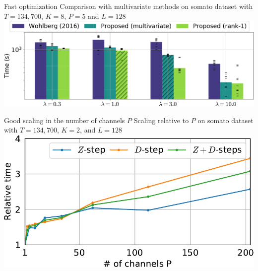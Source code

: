 \documentclass{beamer}
\begin{document}
\begin{frame}{Fast optimization}
Comparison with multivariate methods on somato dataset with $T=134,700$, $K=8$, $P=5$ and $L=128$\\[1em]
\includegraphics[width=\textwidth]{all_last_0001_T_13470_P5_K8_L128}
\end{frame}

\begin{frame}{Good scaling in the number of channels $P$}
Scaling relative to $P$ on somato dataset with $T=134,700$, $K=2$, and $L=128$\\[1em]
\includegraphics[width=\textwidth]{scaling_channels_reg0_001_mean_rank1_K2_L128.pdf}
\end{frame}
\end{document}
